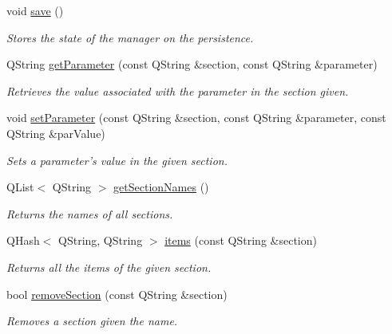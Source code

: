 \begin{DoxyCompactItemize}
void \hyperlink{classBrisaCore_1_1BrisaConfigurationManager_a3da3cd7739a19d536d763cef39d8adfa}{save} ()
\begin{DoxyCompactList}\small\item\em Stores the state of the manager on the persistence. \item\end{DoxyCompactList}\item 
QString \hyperlink{classBrisaCore_1_1BrisaConfigurationManager_abdfdf034b2bd536aa85cf3ecfc2c5f07}{getParameter} (const QString \&section, const QString \&parameter)
\begin{DoxyCompactList}\small\item\em Retrieves the value associated with the parameter in the section given. \item\end{DoxyCompactList}\item 
void \hyperlink{classBrisaCore_1_1BrisaConfigurationManager_a739851682001ab3417779eaf39f646ec}{setParameter} (const QString \&section, const QString \&parameter, const QString \&parValue)
\begin{DoxyCompactList}\small\item\em Sets a parameter's value in the given section. \item\end{DoxyCompactList}\item 
QList$<$ QString $>$ \hyperlink{classBrisaCore_1_1BrisaConfigurationManager_a6a9e2549510762f81e592a51c805ab6e}{getSectionNames} ()
\begin{DoxyCompactList}\small\item\em Returns the names of all sections. \item\end{DoxyCompactList}\item 
QHash$<$ QString, QString $>$ \hyperlink{classBrisaCore_1_1BrisaConfigurationManager_adac936cafe02d040a4a69fe96ec0e64d}{items} (const QString \&section)
\begin{DoxyCompactList}\small\item\em Returns all the items of the given section. \item\end{DoxyCompactList}\item 
bool \hyperlink{classBrisaCore_1_1BrisaConfigurationManager_a99863f30d930844f274e48d0ac289791}{removeSection} (const QString \&section)
\begin{DoxyCompactList}\small\item\em Removes a section given the name. \item\end{DoxyCompactList}\end{DoxyCompactItemize}


